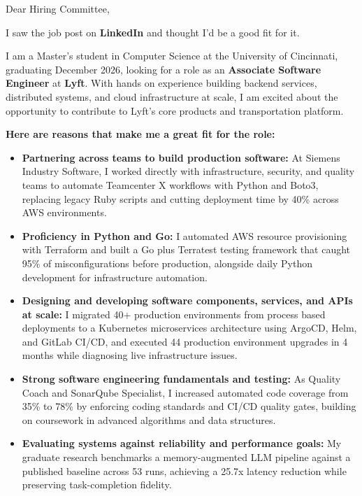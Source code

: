 \documentclass[11pt]{letter}
\date{}
\begin{document}
\begin{letter}{}

\opening{Dear Hiring Committee,}

I saw the job post on \textbf{LinkedIn} and thought I'd be a good fit for it.

I am a Master's student in Computer Science at the University of Cincinnati, graduating December 2026, looking for a role as an \textbf{Associate Software Engineer} at \textbf{Lyft}. With hands on experience building backend services, distributed systems, and cloud infrastructure at scale, I am excited about the opportunity to contribute to Lyft's core products and transportation platform.

\textbf{Here are reasons that make me a great fit for the role:}

\begin{itemize}[leftmargin=*, itemsep=0.45em]
    \item \textbf{Partnering across teams to build production software:} At Siemens Industry Software, I worked directly with infrastructure, security, and quality teams to automate Teamcenter X workflows with Python and Boto3, replacing legacy Ruby scripts and cutting deployment time by 40\% across AWS environments.

    \item \textbf{Proficiency in Python and Go:} I automated AWS resource provisioning with Terraform and built a Go plus Terratest testing framework that caught 95\% of misconfigurations before production, alongside daily Python development for infrastructure automation.

    \item \textbf{Designing and developing software components, services, and APIs at scale:} I migrated 40+ production environments from process based deployments to a Kubernetes microservices architecture using ArgoCD, Helm, and GitLab CI/CD, and executed 44 production environment upgrades in 4 months while diagnosing live infrastructure issues.

    \item \textbf{Strong software engineering fundamentals and testing:} As Quality Coach and SonarQube Specialist, I increased automated code coverage from 35\% to 78\% by enforcing coding standards and CI/CD quality gates, building on coursework in advanced algorithms and data structures.

    \item \textbf{Evaluating systems against reliability and performance goals:} My graduate research benchmarks a memory-augmented LLM pipeline against a published baseline across 53 runs, achieving a 25.7x latency reduction while preserving task-completion fidelity.
\end{itemize}


\end{letter}
\end{document}
